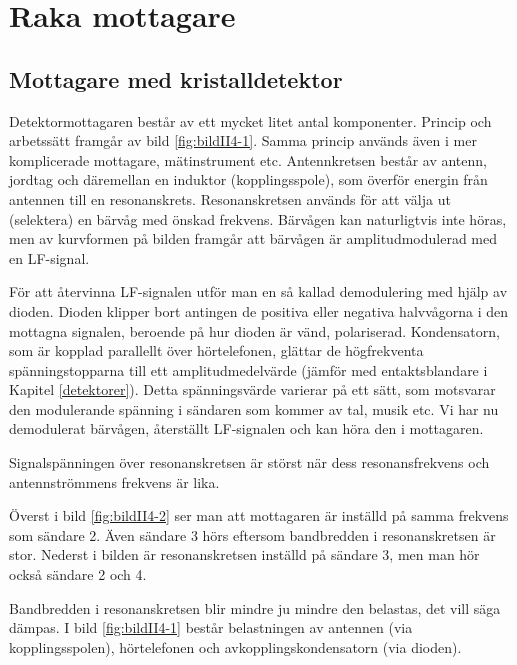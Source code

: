 \section{Raka mottagare}

\subsection{Mottagare med kristalldetektor}


Detektormottagaren består av ett mycket litet antal komponenter.
Princip och arbetssätt framgår av bild \ref{fig:bildII4-1}.
Samma princip används även i mer komplicerade mottagare, mätinstrument etc.
Antennkretsen består av antenn, jordtag och däremellan en induktor
(kopplingsspole), som överför energin från antennen till en resonanskrets.
Resonanskretsen används för att välja ut (selektera) en bärvåg med önskad
frekvens.
Bärvågen kan naturligtvis inte höras, men av kurvformen på bilden framgår
att bärvågen är amplitudmodulerad med en LF-signal.

För att återvinna LF-signalen utför man en så kallad demodulering med hjälp
av dioden.
Dioden klipper bort antingen de positiva eller negativa halvvågorna i den
mottagna signalen, beroende på hur dioden är vänd, polariserad.
Kondensatorn, som är kopplad parallellt över hörtelefonen, glättar de
högfrekventa spänningstopparna till ett amplitudmedelvärde (jämför med
entaktsblandare i Kapitel \ref{detektorer}).
Detta spänningsvärde varierar på ett sätt, som motsvarar den modulerande
spänning i sändaren som kommer av tal, musik etc.
Vi har nu demodulerat bärvågen, återställt LF-signalen och kan höra den i
mottagaren.


Signalspänningen över resonanskretsen är störst när dess
resonansfrekvens och antennströmmens frekvens är lika.

Överst i bild \ref{fig:bildII4-2} ser man att mottagaren är inställd på
samma frekvens som sändare 2.
Även sändare 3 hörs eftersom bandbredden i resonanskretsen är stor.
Nederst i bilden är resonanskretsen inställd på sändare 3, men man hör
också sändare 2 och 4.

Bandbredden i resonanskretsen blir mindre ju mindre den belastas,
det vill säga dämpas.
I bild \ref{fig:bildII4-1} består belastningen av antennen (via
kopplingsspolen), hörtelefonen och avkopplingskondensatorn (via dioden).

